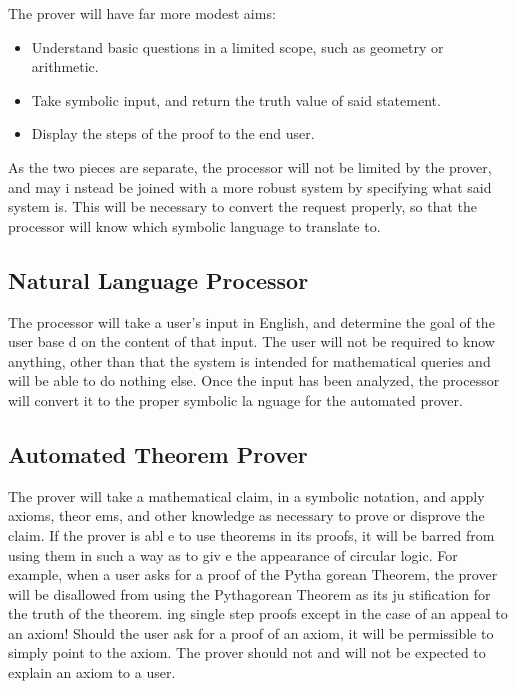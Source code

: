 The prover will have far more modest aims:                                                
\begin{itemize}                                                                           
\item{Understand basic questions in a limited scope, such as geometry or arithmetic.}     
\item{Take symbolic input, and return the truth value of said statement.}                 
\item{Display the steps of the proof to the end user.}                                    
\end{itemize}                                                                             
                                                                                          
As the two pieces are separate, the processor will not be limited by the prover, and may i
nstead be joined with a more robust system by specifying what said system is. This will be
 necessary to convert the request properly, so that the processor will know which symbolic
 language to translate to.                                                                
\subsection{Natural Language Processor}                                                
The processor will take a user's input in English, and determine the goal of the user base
d on the content of that input. The user will not be required to know anything, other than
 that the system is intended for mathematical queries and will be able to do nothing else.
 Once the input has been analyzed, the processor will convert it to the proper symbolic la
nguage for the automated prover.                                                          
\subsection{Automated Theorem Prover}                                                  
                                                                                          
The prover will take a mathematical claim, in a symbolic notation, and apply axioms, theor
ems, and other knowledge as necessary to prove or disprove the claim. If the prover is abl
e to use theorems in its proofs, it will be barred from using them in such a way as to giv
e the appearance of circular logic. For example, when a user asks for a proof of the Pytha
gorean Theorem, the prover will be disallowed from using the Pythagorean Theorem as its ju
stification for the truth of the theorem. %
ing single step proofs except in the case of an appeal to an axiom!                       
Should the user ask for a proof of an axiom, it will be permissible to simply point to the
 axiom. The prover should not and will not be expected to explain an axiom to a user. 

